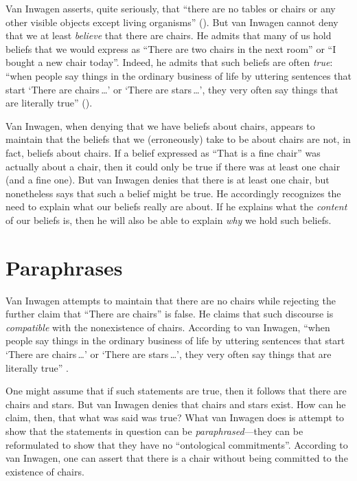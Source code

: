 \documentclass[12pt,twoside]{reedfancy}
\begin{document}
\begin{spacing}{1.25}
Van Inwagen asserts, quite seriously, that ``there are no tables or
chairs or any other visible objects except living organisms''
(\citeyear[1]{inwagen1995}).  But van Inwagen cannot deny that we at
least {\em believe} that there are chairs.  He admits that many of us
hold beliefs that we would express as ``There are two chairs in the
next room'' or ``I bought a new chair today''.  Indeed, he admits that
such beliefs are often {\em true}: ``when people say things in the
ordinary business of life by uttering sentences that start `There are
chairs\,\ldots ' or `There are stars\,\ldots ', they very often say
things that are literally true'' (\citeyear[102]{inwagen1995}).

Van Inwagen, when denying that we have beliefs about chairs, appears
to maintain that the beliefs that we (erroneously) take to be about
chairs are not, in fact, beliefs about chairs.  If a belief expressed
as ``That is a fine chair'' was actually about a chair, then it could
only be true if there was at least one chair (and a fine one).  But
van Inwagen denies that there is at least one chair, but nonetheless
says that such a belief might be true.  He accordingly recognizes the
need to explain what our beliefs really are about.  If he explains
what the {\em content} of our beliefs is, then he will also be able to
explain {\em why} we hold such beliefs.

\section{Paraphrases}
\label{van-paraphrase}
Van Inwagen attempts to maintain that there are no chairs while
rejecting the further claim that ``There are chairs'' is false.  He
claims that such discourse is {\em compatible} with the nonexistence
of chairs.  According to van Inwagen, ``when people say things in the
ordinary business of life by uttering sentences that start `There are
chairs\,\ldots ' or `There are stars\,\ldots ', they very often say
things that are literally true'' \citep[102]{inwagen1995}.

One might assume that if such statements are true, then it follows
that there are chairs and stars.  But van Inwagen denies that chairs
and stars exist.  How can he claim, then, that what was said was true?
What van Inwagen does is attempt to show that the statements in
question can be {\em paraphrased}---they can be reformulated to show
that they have no ``ontological commitments''.  According to van
Inwagen, one can assert that there is a chair without being committed
to the existence of chairs.


\end{spacing}
\end{document}
